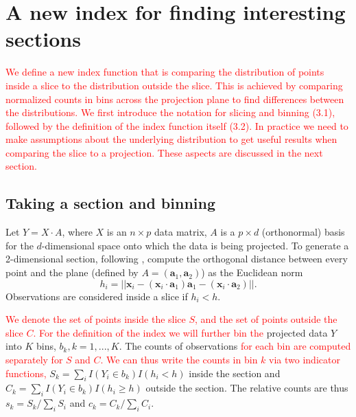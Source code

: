 \documentclass[]{interact}
\theoremstyle{plain}%
\theoremstyle{definition}
\theoremstyle{remark}
\begin{document}
\hypertarget{a-new-index-for-finding-interesting-sections}{%
\section{\texorpdfstring{A new index for finding interesting sections
\label{sec:index}}{A new index for finding interesting sections }}\label{a-new-index-for-finding-interesting-sections}}

\textcolor{red}{We define a new index function that is comparing the distribution of points inside a slice to the distribution outside the slice. This is achieved by comparing normalized counts in bins across the projection plane to find differences between the distributions. We first introduce the notation for slicing and binning (3.1), followed by the definition of the index function itself (3.2).
In practice we need to make assumptions about the underlying distribution to get useful results when comparing the slice to a projection. These aspects are discussed in the next section.
}

\hypertarget{taking-a-section-and-binning}{%
\subsection{Taking a section and
binning}\label{taking-a-section-and-binning}}

Let \(Y=X\cdot A\), where \(X\) is an \(n\times p\) data matrix, \(A\)
is a \(p\times d\) (orthonormal) basis for the \(d\)-dimensional space
onto which the data is being projected. To generate a 2-dimensional
section, following \citet{laa2019slice}, compute the orthogonal distance
between every point and the plane (defined by
\(A = (\mathbf{a}_1, \mathbf{a}_2)\)) as the Euclidean norm
\begin{equation}
h_i = ||\mathbf{x}_i - (\mathbf{x}_i\cdot \mathbf{a}_1) \mathbf{a}_1 - (\mathbf{x}_i\cdot \mathbf{a}_2)||.
\end{equation} Observations are considered inside a slice if
\(h_i < h\).

\textcolor{red}{We denote the set of points inside the slice $S$, and the set of points outside the slice $C$. For the definition of the index we will further bin the}
projected data \(Y\) into \(K\) bins, \(b_k, k=1, ..., K\). The counts
of observations
\textcolor{red}{for each bin are computed separately for $S$ and $C$. We can thus write the counts in bin $k$ via two indicator functions,}
\(S_{k}=\sum_{i} I(Y_i \in b_{k})I(h_i < h)\) inside the section and
\(C_{k}=\sum_{i} I(Y_i \in b_{k})I(h_i \geq h)\) outside the section.
The relative counts are thus \(s_k = S_k / \sum_i S_i\) and
\(c_k = C_k / \sum_i C_i\).
\end{document}
